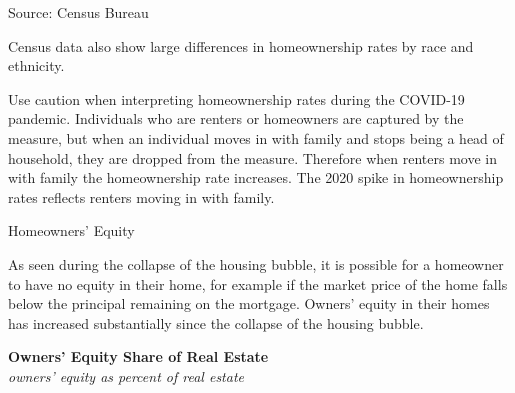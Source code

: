 \documentclass{report}
\makeatletter
\newcommand{\tbllink}[1]{\href{https://raw.githubusercontent.com/bdecon/US-chartbook/master/chartbook/data/#1}{\faTable}}
\newcommand*\short[1]{\expandafter\@gobbletwo\number\numexpr#1\relax}
\newcommand{\shdateaxisticks}{
		date coordinates in=x, axis line style={draw=none},
		xmax={2023-11-01},
		max space between ticks=40,	    
		xtick={{1990-01-01}, {1995-01-01}, {2000-01-01}, 
			{2005-01-01}, {2010-01-01}, {2015-01-01}, {2020-01-01}},
		minor xtick={},
		enlarge y limits={0.06}, enlarge x limits={0.01},
		}
\newcommand{\stdline}[4]{\addplot[very thick, no markers, color=#1] 
		table [x=#2, y=#3, col sep=comma] {#4};	}
\newcommand{\rbars}{
		\fill[color=black!10] (axis cs:{1990-07-01},\pgfkeysvalueof{/pgfplots/ymin}) rectangle 
			(axis cs:{1991-03-01}, \pgfkeysvalueof{/pgfplots/ymax});
		\fill[color=black!10] (axis cs:{2007-12-01},\pgfkeysvalueof{/pgfplots/ymin}) rectangle 
			(axis cs:{2009-07-01}, \pgfkeysvalueof{/pgfplots/ymax});
		\fill[color=black!10] (axis cs:{2001-03-01},\pgfkeysvalueof{/pgfplots/ymin}) rectangle 
			(axis cs:{2001-11-01}, \pgfkeysvalueof{/pgfplots/ymax});
		\fill[color=black!10] (axis cs:{2020-02-01},\pgfkeysvalueof{/pgfplots/ymin}) rectangle 
			(axis cs:{2020-05-01}, \pgfkeysvalueof{/pgfplots/ymax});}
\makeatother
\begin{document}
{\begin{minipage}{0.43\textwidth}
\footnotesize{Source: Census Bureau} \hfill \tbllink{homeown2.csv} 

\end{minipage}\hspace{6mm}
\begin{minipage}{0.285\textwidth}
\small Census data also show large differences in homeownership rates by race and ethnicity. 


\end{minipage}\hspace{5mm}
\vspace{1mm}

\begin{minipage}{0.76\textwidth}
\small Use caution when interpreting homeownership rates during the COVID-19 pandemic. Individuals who are renters or homeowners are captured by the measure, but when an individual moves in with family and stops being a head of household, they are dropped from the measure. Therefore when renters move in with family the homeownership rate increases. The 2020 spike in homeownership rates reflects renters moving in with family. 
\vspace{1mm}

\normalsize Homeowners' Equity
\vspace*{-1mm}

\small As seen during the collapse of the housing bubble, it is possible for a homeowner to have no equity in their home, for example if the market price of the home falls below the principal remaining on the mortgage. Owners' equity in their homes has increased substantially since the collapse of the housing bubble. 
\end{minipage}

\begin{minipage}{0.265\textwidth}
\small 
\end{minipage}\hspace{7mm}
\begin{minipage}{0.45\textwidth} 
\vspace*{-4mm}

\normalsize \textbf{Owners' Equity Share of Real Estate}\\
\footnotesize{\textit{owners' equity as percent of real estate}}
\vspace{2.9cm}

\hspace{3mm} 


\end{minipage}}
\end{document}
